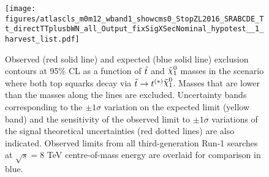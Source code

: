 %
%
%
%
%






\begin{figure}[h]
  \begin{center} \texttt{[image: figures/atlascls\_m0m12\_wband1\_showcms0\_StopZL2016\_SRABCDE\_Tt\_directTTplusbWN\_all\_Output\_fixSigXSecNominal\_hypotest\_\_1\_harvest\_list.pdf]}%
    \caption[Exclusion contours as a function of $\stop$ and
      $\ninoone$ masses in the scenario where both top squarks decay
      via $\stop\to t^{(*)} \ninoone$.]{Observed (red solid line) and expected (blue solid line)
      exclusion contours at 95\% CL as a function of $\stop$ and
      $\ninoone$ masses in the scenario where both top squarks decay
      via $\stop\to t^{(*)} \ninoone$. Masses that are lower than the masses along the lines are excluded. Uncertainty bands corresponding to the $\pm 1
      \sigma$ variation on the expected limit (yellow band) and the
      sensitivity of the observed limit to $\pm 1\sigma$ variations of
      the signal theoretical uncertainties (red dotted lines) are also
      indicated. Observed limits from all third-generation Run-1 searches~\cite{Atlas8TeVSummary} at $\sqrt{s}=8$ TeV centre-of-mass energy are overlaid for comparison in blue.}
    \label{fig:SRABC_exclusion}%
  \end{center}
\end{figure}


